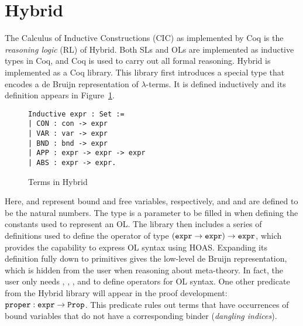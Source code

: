 \section{Hybrid}
\label{sec:hybrid}

The Calculus of Inductive Constructions (CIC)
\cite{PaulinMohring93,BertotCasteran:2004} as implemented by Coq is
the \emph{reasoning logic} (RL) of Hybrid.  Both SLs and OLs are
implemented as inductive types in Coq, and Coq is used to carry out
all formal reasoning.
%
%
Hybrid is implemented as a Coq library.  This library first introduces
a special type  that encodes a de Bruijn representation of
$\lambda$-terms.  It is defined inductively and its definition appears
in Figure~\ref{fig:expr}.
\begin{figure}
\begin{lstlisting}
Inductive expr : Set :=
| CON : con -> expr
| VAR : var -> expr
| BND : bnd -> expr
| APP : expr -> expr -> expr
| ABS : expr -> expr.
\end{lstlisting}
\caption{Terms in Hybrid \label{fig:expr}}
\end{figure}
Here,  and
 represent bound and free variables, respectively, and
 and  are defined to be the natural numbers.  The
type  is a parameter to be filled in when defining the
constants used to represent an OL.  The library then includes a series
of definitions used to define the operator  of type
$(\texttt{expr}\rightarrow\texttt{expr})\rightarrow\texttt{expr}$, which
provides the capability to express OL syntax using HOAS.  Expanding
its definition fully down to primitives gives the low-level de Bruijn
representation, which is hidden from the user when reasoning about
meta-theory. In fact, the user only needs , ,
, and  to define operators for OL syntax.
One other predicate from the Hybrid library will appear in the proof
development: $\texttt{proper}:\texttt{expr}\rightarrow\texttt{Prop}$.  This
predicate rules out terms that have occurrences of bound variables
that do not have a corresponding binder (\emph{dangling indices}).

